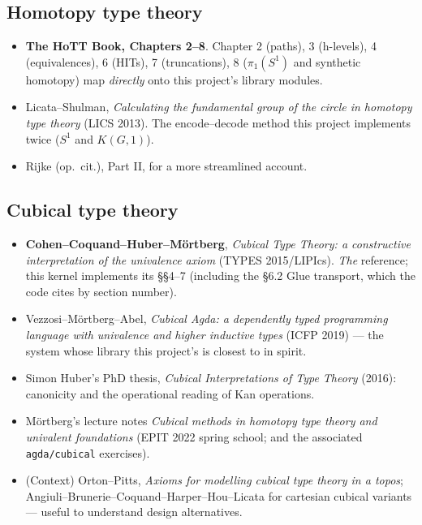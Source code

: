 \documentclass[11pt]{article}
\begin{document}
\subsection{Homotopy type theory}
\begin{itemize}[leftmargin=1.5em]
\item \textbf{The HoTT Book, Chapters 2--8}.  Chapter 2 (paths),
3 (h-levels), 4 (equivalences), 6 (HITs), 7 (truncations),
8 ($\pi_1(S^1)$ and synthetic homotopy) map \emph{directly} onto this
project's library modules.
\item Licata--Shulman, \emph{Calculating the fundamental group of the
circle in homotopy type theory} (LICS 2013).  The encode--decode method
this project implements twice ($S^1$ and $K(G,1)$).
\item Rijke (op.\ cit.), Part II, for a more streamlined account.
\end{itemize}

\subsection{Cubical type theory}
\begin{itemize}[leftmargin=1.5em]
\item \textbf{Cohen--Coquand--Huber--M\"ortberg}, \emph{Cubical Type
Theory: a constructive interpretation of the univalence axiom} (TYPES
2015/LIPIcs).  \emph{The} reference; this kernel implements its \S\S4--7
(including the \S6.2 Glue transport, which the code cites by section
number).
\item Vezzosi--M\"ortberg--Abel, \emph{Cubical Agda: a dependently typed
programming language with univalence and higher inductive types} (ICFP
2019) --- the system whose library this project's is closest to in
spirit.
\item Simon Huber's PhD thesis, \emph{Cubical Interpretations of Type
Theory} (2016): canonicity and the operational reading of Kan operations.
\item M\"ortberg's lecture notes \emph{Cubical methods in homotopy type
theory and univalent foundations} (EPIT 2022 spring school; and the
associated \texttt{agda/cubical} exercises).
\item (Context) Orton--Pitts, \emph{Axioms for modelling cubical type
theory in a topos}; Angiuli--Brunerie--Coquand--Harper--Hou--Licata for
cartesian cubical variants --- useful to understand design alternatives.
\end{itemize}
\end{document}
